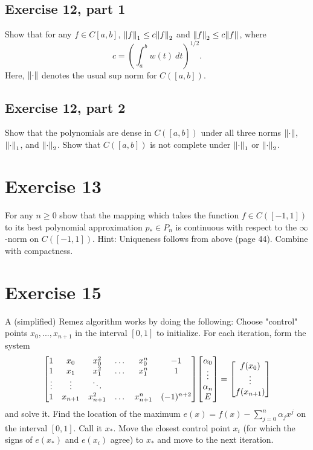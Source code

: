 \subsection{Exercise 12, part 1}
Show that for any $f \in C[a, b]$, $\norm{f}_1 \leq c\norm{f}_2$ and $\norm{f}_2 \leq c\norm{f}$, where 
\[c = \left(\int_a^b w(t) \ dt\right)^{1/2}.\]
Here, $\norm{\cdot}$ denotes the usual sup norm for $C([a, b])$. 

\newpage
\subsection{Exercise 12, part 2}
Show that the polynomials are dense in $C([a, b])$ under all three norms $\norm{\cdot}$, $\norm{\cdot}_1$, and $\norm{\cdot}_2$. Show that $C([a, b])$ is not complete under $\norm{\cdot}_1$ or $\norm{\cdot}_2$. 

\newcommand{\pstar}{p_*}

\newpage
\section{Exercise 13}
For any $n \geq 0$ show that the mapping which takes the function $f\in C([-1, 1])$ to its best polynomial approximation $\pstar \in P_n$ is continuous with respect to the $\infty$-norm on $C([-1, 1])$. Hint: Uniqueness follows from above (page 44). Combine with compactness.  

\newcommand{\xstar}{x_*}

\newpage
\section{Exercise 15}
A (simplified) Remez algorithm works by doing the following: Choose "control" points $x_0, ..., x_{n+1}$ in the interval $[0, 1]$ to initialize. For each iteration, form the system
\[
\mqty[1 &x_0&x_0^2&\dots &x_0^n&-1\\
      1 &x_1&x_1^2&\dots &x_1^n& 1\\
      \vdots&\vdots&\ddots  &     &  \\
      1&x_{n+1}&x_{n+1}^2&\dots&x_{n+1}^n&(-1)^{n+2}] 
\mqty[\alpha_0\\\vdots\\\alpha_n\\E] = \mqty[f(x_0)\\ \vdots\\f(x_{n+1})]
\]
and solve it. Find the location of the maximum $e(x) = f(x) - \sum_{j = 0}^n\alpha_j x^j$ on the interval $[0, 1]$. Call it $\xstar$. Move the closest control point $x_i$ (for which the signs of $e(\xstar)$ and $e(x_i)$ agree) to $\xstar$ and move to the next iteration.  
